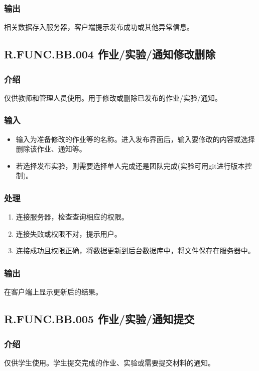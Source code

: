       \subsubsection{输出}
      相关数据存入服务器，客户端提示发布成功或其他异常信息。

    \subsection{R.FUNC.BB.004 作业/实验/通知修改删除}
      \subsubsection{介绍}
      仅供教师和管理人员使用。用于修改或删除已发布的作业/实验/通知。
      \subsubsection{输入}
	    \begin{itemize}
        \item 输入为准备修改的作业等的名称。进入发布界面后，输入要修改的内容或选择删除该作业、通知等。
	      \item 若选择发布实验，则需要选择单人完成还是团队完成(实验可用git进行版本控制)。
      \end{itemize}
      \subsubsection{处理}
      \begin{enumerate}
        \item 连接服务器，检查查询相应的权限。
        \item 连接失败或权限不对，提示用户。
        \item 连接成功且权限正确，将数据更新到后台数据库中，将文件保存在服务器中。
      \end{enumerate}
      \subsubsection{输出}
      在客户端上显示更新后的结果。

    \subsection{R.FUNC.BB.005 作业/实验/通知提交}
      \subsubsection{介绍}
      仅供学生使用。学生提交完成的作业、实验或需要提交材料的通知。
